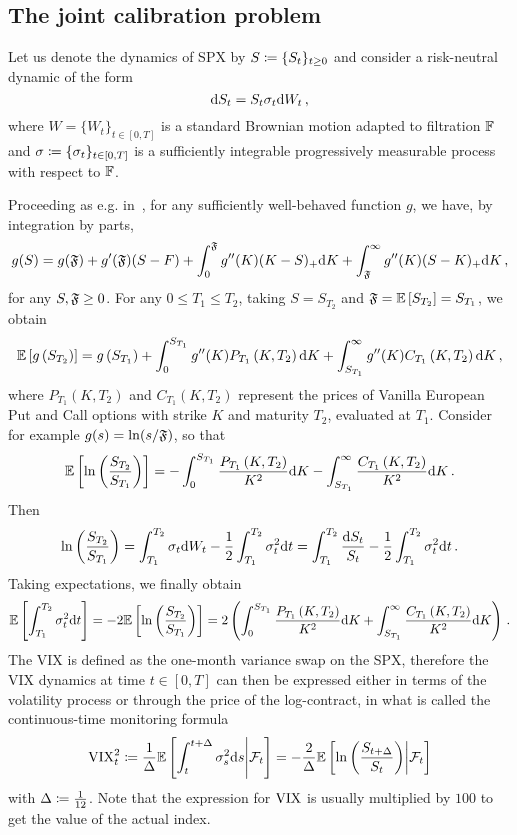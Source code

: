 \subsection{The joint calibration problem}

Let us denote the dynamics of SPX by $S\coloneqq\{S_t\}_{t\geq 0}$ and consider a risk-neutral dynamic of the form
\[
\mathrm{d} S_t = S_t \sigma_t \mathrm{d} W_t\,,
\]
where $W=\{W_t\}_{t\in[0,T]}$ is a standard Brownian motion adapted to filtration $\mathbb{F}$ and $\sigma\coloneqq\{\sigma_t\}_{t\in[0,T]}$ is a sufficiently integrable progressively measurable process with respect to $\mathbb{F}$. 

Proceeding as e.g. in~\cite[Chapter~11]{Gatheral2006TheGuide}, for any sufficiently well-behaved function $g$, we have, by integration by parts,
$$
g(S)=g(\mathfrak{F})+g'(\mathfrak{F})(S-F)+\int_0^{\mathfrak{F}} g''(K)(K-S)_{+} \mathrm{d} K+\int_{\mathfrak{F}}^{\infty} g''(K)(S-K)_{+} \mathrm{d} K\,,
$$
for any $S, \mathfrak{F} \geq 0$. For any $0 \leq T_1 \leq T_2$, taking $S=S_{T_2}$ and $\mathfrak{F} = \mathbb{E}\left[S_{T_2}\right]=S_{T_1}$, we obtain
$$
\mathbb{E}\left[g\left(S_{T_2}\right)\right]=g\left(S_{T_1}\right)+\int_0^{S_{T_1}} g''(K) P_{T_1}\left(K, T_2\right) \mathrm{d} K+\int_{S_{T_1}}^{\infty} g''(K) C_{T_1}\left(K, T_2\right) \mathrm{d} K\,,
$$
where $P_{T_1}\left(K, T_2\right)$ and $C_{T_1}\left(K, T_2\right)$ represent the prices of Vanilla European Put and Call options with strike $K$ and maturity $T_2$, evaluated at $T_1$. Consider for example $g(s)=\ln (s / \mathfrak{F})$, so that
$$
\mathbb{E}\left[\ln \left(\frac{S_{T_2}}{S_{T_1}}\right)\right]=-\int_0^{S_{T_1}} \frac{P_{T_1}\left(K, T_2\right)}{K^2} \mathrm{d} K-\int_{S_{T_1}}^{\infty} \frac{C_{T_1}\left(K, T_2\right)}{K^2} \mathrm{d} K\,.
$$
Then
$$
\ln \left(\frac{S_{T_2}}{S_{T_1}}\right)=\int_{T_1}^{T_2} \sigma_t \mathrm{d} W_t-\frac{1}{2} \int_{T_1}^{T_2} \sigma_t^2 \mathrm{d} t=\int_{T_1}^{T_2} \frac{\mathrm{d} S_t}{S_t}-\frac{1}{2} \int_{T_1}^{T_2} \sigma_t^2 \mathrm{d} t\,.
$$
Taking expectations, we finally obtain
\[
\mathbb{E}\left[\int_{T_1}^{T_2} \sigma_t^2 \mathrm{d} t\right]=-2 \mathbb{E}\left[\ln \left(\frac{S_{T_2}}{S_{T_1}}\right)\right]=2\left(\int_0^{S_{T_1}} \frac{P_{T_1}\left(K, T_2\right)}{K^2} \mathrm{d} K+\int_{S_{T_1}}^{\infty} \frac{C_{T_1}\left(K, T_2\right)}{K^2} \mathrm{d} K\right)\,.
\]
The VIX is defined as the one-month variance swap on the SPX, therefore the VIX dynamics at time $t\in[0, T]$ can then be expressed either in terms of the volatility process or through the price of the log-contract, in what is called the continuous-time monitoring formula
\begin{equation*}
\mathrm{VIX}_{t}^{2} \coloneqq \frac{1}{\Delta} \mathbb{E}\left[\int_{t}^{t+\Delta} \sigma^2_{s} \mathrm{d} s\middle\vert\mathcal{F}_t \right] = -\frac{2}{\Delta}\mathbb{E} \left[\ln\left(\frac{S_{t+\Delta}}{S_t} \right) \middle\vert\mathcal{F}_t \right] \label{eq:VIXdef}
\end{equation*}
with $\Delta\coloneqq\frac{1}{12}$. Note that the expression for $\mathrm{VIX}$ is usually multiplied by $100$ to get the value of the actual index. 

